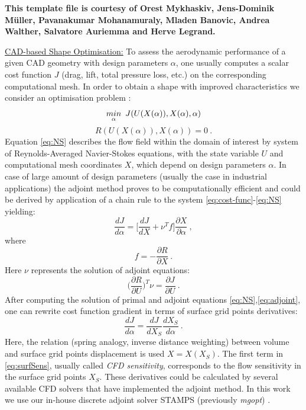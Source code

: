 \documentclass{article}
\begin{document}
\textbf{This template file is courtesy of Orest Mykhaskiv, Jens-Dominik M\"uller, Pavanakumar Mohanamuraly, Mladen Banovic, Andrea Walther, Salvatore Auriemma and Herve Legrand.}


\vspace{10pt}
\noindent\underline{CAD-based Shape Optimisation:}\vspace{0.2em}\newline
To assess the aerodynamic performance of a given CAD geometry with design parameters $\alpha$, one usually computes a scalar cost function $J$ (drag, lift, total pressure loss, etc.) on the corresponding computational mesh.  In order to obtain a shape with improved characteristics we consider an optimisation problem \cite{jameson88aerodynamic}:       
\begin{equation}
\label{eq:cost-func}
\underset{\alpha}{min} \hspace{0.5em} J(U(X(\alpha)), X(\alpha), \alpha)
\end{equation}
\begin{equation}
\label{eq:NS}
R(U(X(\alpha)), X(\alpha)) = 0\:. 
\end{equation}
Equation \eqref{eq:NS} describes the flow field within the domain of interest by system of Reynolds-Averaged Navier-Stokes equations, with the state variable $U$ and computational mesh coordinates $X$, which depend on design parameters $\alpha$. In case of large amount of design parameters (usually the case in industrial applications) the adjoint method proves to be computationally efficient and could be derived by application of a chain rule to the system \eqref{eq:cost-func}-\eqref{eq:NS} yielding:
\begin{equation}
\label{eq:sens}
\dfrac{dJ}{d\alpha}=\Big[ \frac{dJ}{dX} +\nu^Tf \Big]\frac{\partial X}{\partial \alpha}\:,
\end{equation}
where 
\begin{equation}
f = -\frac{\partial R}{\partial X}\:.
\end{equation}
Here $\nu$ represents the solution of adjoint equations:
\begin{equation}
\label{eq:adjoint}
\Big ( \frac{\partial R}{\partial U}\Big)^T\nu=\frac{\partial J}{\partial U}\:.
\end{equation}
After computing the solution of primal and adjoint equations \eqref{eq:NS},\eqref{eq:adjoint}, one can rewrite cost function gradient in terms of surface grid points derivatives:
\begin{equation}
\label{eq:surfSens}
\frac{dJ}{d\alpha}=\frac{dJ}{dX_S}\frac{dX_S}{d\alpha}\:.
\end{equation}
Here, the relation (spring analogy, inverse distance weighting) between volume and surface grid points displacement is used $X = X(X_S)$. 
The first term in \eqref{eq:surfSens}, usually called \textit{CFD sensitivity}, corresponds to the flow sensitivity in the surface grid points $X_S$. These derivatives could be calculated by several available CFD solvers that have implemented the adjoint method. In this work we use our in-house discrete adjoint solver STAMPS (previously \textit{mgopt}) \cite{xu2015thesis}. 
\end{document}

